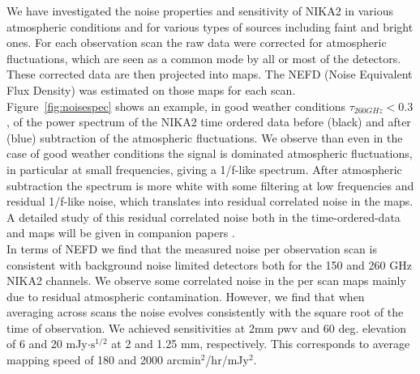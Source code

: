 \documentclass[]{aa} %
\begin{document}
We have investigated the noise properties and sensitivity of NIKA2 in various atmospheric conditions and for various types of sources including faint and bright ones. For each observation scan the raw data were corrected for atmospheric fluctuations, which are seen as a common mode by all or most of the detectors. These corrected data are then projected into maps. The NEFD (Noise Equivalent Flux Density) was estimated on those maps for each scan. \\

Figure~\ref{fig:noisespec} shows an example, in good weather conditions $\tau_{260 GHz} < 0.3$, of the power spectrum of the NIKA2 time ordered data before (black) and after (blue) subtraction of the atmospheric fluctuations.
We observe than even in the case of good weather conditions the signal is dominated atmospheric fluctuations, in particular at small frequencies, giving a 1/f-like spectrum. After atmospheric subtraction the spectrum is more white with some filtering at low frequencies and residual 1/f-like noise, which translates into residual correlated noise in the maps. A detailed study of this residual correlated noise both in the time-ordered-data and maps will be given in companion papers \cite{commissioning,pipeline}.\\

In terms of NEFD we find that the measured noise per observation scan is consistent with background noise limited detectors both for the 150 and 260 GHz NIKA2 channels. We observe some correlated noise in the per scan maps mainly due to residual atmospheric contamination. However, we find that when averaging across scans the noise evolves consistently with the square root of the time of observation. We achieved sensitivities at 2mm pwv and 60 deg. elevation of 6 and 20 mJy$\cdot\textrm{s}^{1/2}$ at 2 and 1.25 mm, respectively. This corresponds to average mapping speed of 180 and 2000 arcmin$^2$/hr/mJy$^2$. 
\end{document}
